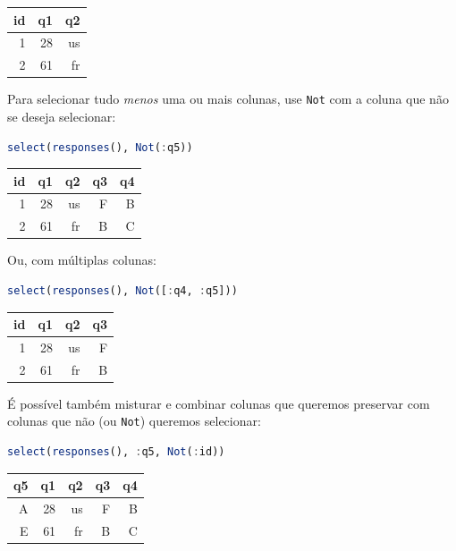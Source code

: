 \documentclass[
  notoc %
]{tufte-book}
\newcommand{\passthrough}[1]{#1}
\begin{document}
\begin{longtable}[]{@{}rrr@{}}
\toprule
id & q1 & q2 \\
\midrule
\endhead
1 & 28 & us \\
2 & 61 & fr \\
\bottomrule
\end{longtable}

Para selecionar tudo \emph{menos} uma ou mais colunas, use
\passthrough{\lstinline!Not!} com a coluna que não se deseja selecionar:

\begin{lstlisting}[language=Julia]
select(responses(), Not(:q5))
\end{lstlisting}

\begin{longtable}[]{@{}rrrrr@{}}
\toprule
id & q1 & q2 & q3 & q4 \\
\midrule
\endhead
1 & 28 & us & F & B \\
2 & 61 & fr & B & C \\
\bottomrule
\end{longtable}

Ou, com múltiplas colunas:

\begin{lstlisting}[language=Julia]
select(responses(), Not([:q4, :q5]))
\end{lstlisting}

\begin{longtable}[]{@{}rrrr@{}}
\toprule
id & q1 & q2 & q3 \\
\midrule
\endhead
1 & 28 & us & F \\
2 & 61 & fr & B \\
\bottomrule
\end{longtable}

É possível também misturar e combinar colunas que queremos preservar com
colunas que não (ou \passthrough{\lstinline!Not!}) queremos selecionar:

\begin{lstlisting}[language=Julia]
select(responses(), :q5, Not(:id))
\end{lstlisting}

\begin{longtable}[]{@{}rrrrr@{}}
\toprule
q5 & q1 & q2 & q3 & q4 \\
\midrule
\endhead
A & 28 & us & F & B \\
E & 61 & fr & B & C \\
\bottomrule
\end{longtable}
\end{document}
